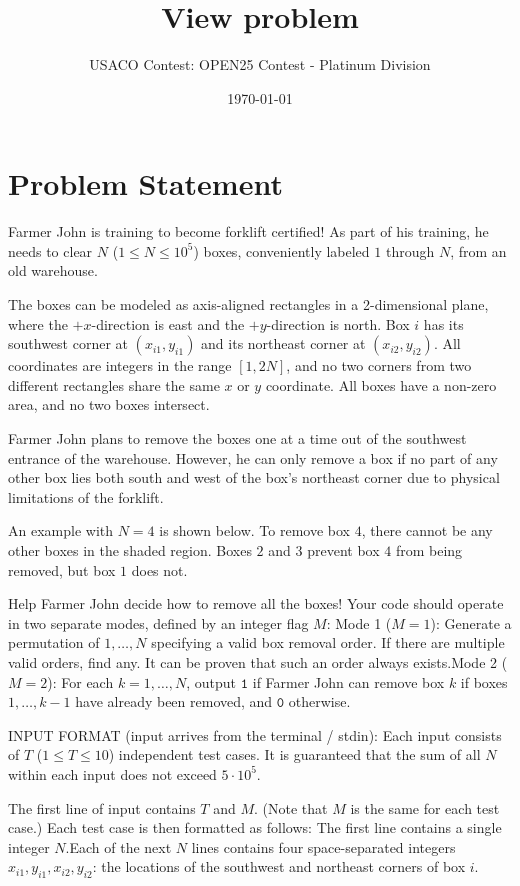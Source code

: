 \documentclass[12pt]{article}
\title{View problem}
\author{USACO Contest: OPEN25 Contest - Platinum Division}
\date{\today}
\begin{document}
\maketitle

\section*{Problem Statement}


Farmer John is training to become forklift certified! As part of his training,
he needs to clear $N$ ($1 \le N \le 10^5$) boxes, conveniently labeled $1$
through $N$, from an old warehouse.

The boxes can be modeled as axis-aligned rectangles in a 2-dimensional plane,
where the $+x$-direction is east and the $+y$-direction is north. Box $i$ has
its southwest corner at $(x_{i1},y_{i1})$ and its northeast corner at
$(x_{i2},y_{i2})$. All coordinates are integers in the range $[1, 2N]$, and no
two corners from two different rectangles share the same $x$ or $y$ coordinate.
All boxes have a non-zero area, and no two boxes intersect.

Farmer John plans to remove the boxes one at a time out of the southwest
entrance of the warehouse. However, he can only remove a box if no part of any
other box lies both south and west of the box's northeast corner due to physical
limitations of the forklift.

An example with $N=4$ is shown below. To remove box $4$, there cannot be any
other boxes in the shaded region. Boxes $2$ and $3$ prevent box $4$ from being
removed, but box $1$ does not.


Help Farmer John decide how to remove all the boxes! Your code should operate in
two separate modes, defined by an integer flag $M$:
Mode 1 ($M = 1$): Generate a permutation of $1, \dots, N$ specifying
a valid box removal order. If there are multiple valid orders, find any. It can
be proven that such an order always exists.Mode 2 ($M = 2$): For each $k = 1, \dots, N$, output $\texttt{1}$ if
Farmer John can remove box $k$ if boxes $1, \dots, k - 1$ have already been
removed, and $\texttt{0}$ otherwise.

INPUT FORMAT (input arrives from the terminal / stdin):
Each input consists of $T$ ($1 \le T \le 10$) independent test cases. It is
guaranteed that the sum of all $N$ within each input does not exceed
$5 \cdot 10^5$.

The first line of input contains $T$ and $M$. (Note that $M$ is the same for
each test case.) Each test case is then formatted as follows:
The first line contains a single integer $N$.Each of the next $N$
lines contains four space-separated integers $x_{i1}, y_{i1}, x_{i2}, y_{i2}$:
the locations of the southwest and northeast corners of box $i$.
\end{document}
